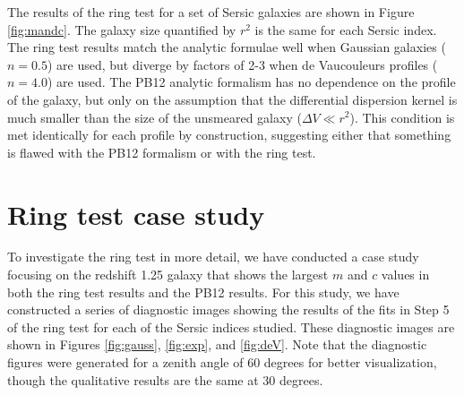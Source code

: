 \documentclass[apj]{emulateapj}
\begin{document}
The results of the ring test for a set of Sersic galaxies are shown in
Figure \ref{fig:mandc}.  The galaxy size quantified by $r^2$ is the
same for each Sersic index.  The ring test results match the analytic
formulae well when Gaussian galaxies ($n=0.5$) are used, but diverge
by factors of 2-3 when de Vaucouleurs profiles ($n=4.0$) are used.
The PB12 analytic formalism has no dependence on the profile of the
galaxy, but only on the assumption that the differential dispersion
kernel is much smaller than the size of the unsmeared galaxy ($\Delta
V \ll r^2$).  This condition is met identically for each profile by
construction, suggesting either that something is flawed with the PB12
formalism or with the ring test.

\begin{figure*}
\begin{center}
\end{center}
\caption[fig1]{\label{fig:mandc} The shear calibration parameters $m$
  and $c$ plotted against redshift.  The results are obtained from the
  ring test assuming a true PSF derived from an elliptical galaxy
  spectrum and reconstruction PSF derived from a G5v stellar spectrum.
  The true galaxy images are simulated using the values: $r_e = 1.1$,
  and $|g| = 0.2$.  Three values of the galaxy Sersic parameter $n$
  are shown: $n=0.5$, corresponding to a Gaussian profile (blue),
  $n=1.0$, corresponding to an exponential profile (green), and
  $n=4.0$, corresponding to a de Vaucouleurs profile (red).  The cyan
  line in each panel shows the analytic result from the PB12
  formalism.  The zenith angle is 30 degrees.}
\end{figure*}

\section{Ring test case study}\label{sec:casestudy}

To investigate the ring test in more detail, we have conducted a case
study focusing on the redshift 1.25 galaxy that shows the largest $m$
and $c$ values in both the ring test results and the PB12 results.
For this study, we have constructed a series of diagnostic images
showing the results of the fits in Step 5 of the ring test for each of
the Sersic indices studied.  These diagnostic images are shown in
Figures \ref{fig:gauss}, \ref{fig:exp}, and \ref{fig:deV}.  Note that
the diagnostic figures were generated for a zenith angle of 60 degrees
for better visualization, though the qualitative results are the same
at 30 degrees.
\end{document}
